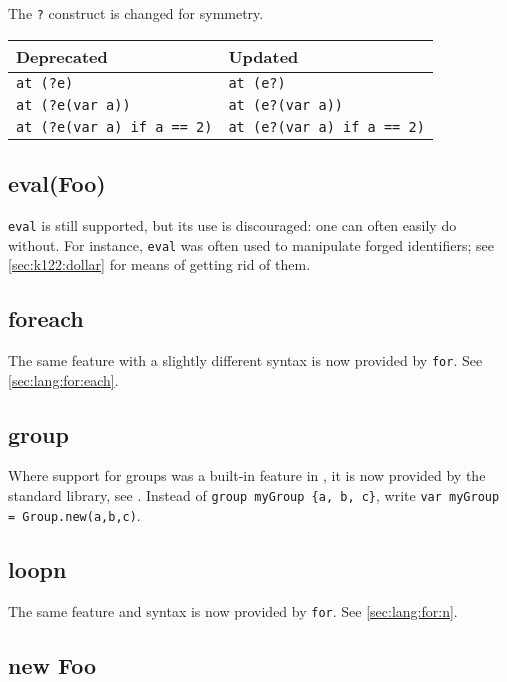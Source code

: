 The \lstinline{?} construct is changed for symmetry.

\begin{center}
  \begin{tabular}{|l|l|}
    \hline
    \textbf{Deprecated} & \textbf{Updated}  \\
    \hline
    \lstinline|at (?e)|                  & \lstinline|at (e?)|\\
    \lstinline|at (?e(var a))|           & \lstinline|at (e?(var a))|\\
    \lstinline|at (?e(var a) if a == 2)| & \lstinline|at (e?(var a) if a == 2)|\\
    \hline
  \end{tabular}
\end{center}


\subsection{eval(Foo)}
\lstinline{eval} is still supported, but its use is discouraged: one
can often easily do without.  For instance, \lstinline{eval} was often
used to manipulate forged identifiers; see \autoref{sec:k122:dollar}
for means of getting rid of them.

\subsection{foreach}
The same feature with a slightly different syntax is now provided by
\lstinline|for|.  See \autoref{sec:lang:for:each}.

\subsection{group}
Where support for groups was a built-in feature in , it is now
provided by the standard library, see .  Instead of
\lstinline|group myGroup {a, b, c}|, write
\lstinline|var myGroup = Group.new(a,b,c)|.

\subsection{loopn}
The same feature and syntax is now provided by \lstinline|for|.  See
\autoref{sec:lang:for:n}.

\subsection{new Foo}

